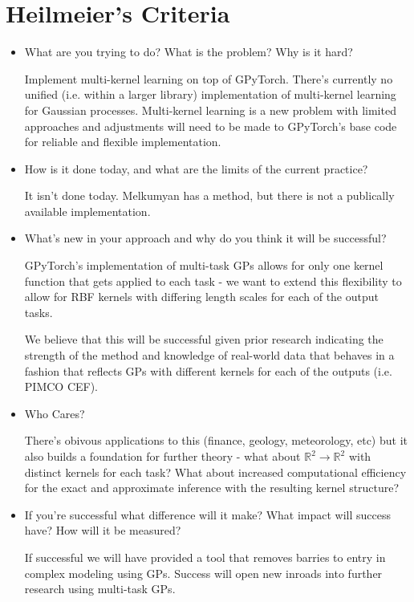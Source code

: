 \documentclass[12pt]{article}
\begin{document}
\section*{Heilmeier's Criteria}
    \begin{itemize}
        \item What are you trying to do? What is the problem? Why is it hard?

        Implement multi-kernel learning on top of GPyTorch. There's currently no unified (i.e. within a larger library) implementation of multi-kernel learning for Gaussian processes. Multi-kernel learning is a new problem with limited approaches and adjustments will need to be made to GPyTorch's base code for reliable and flexible implementation.

        \item How is it done today, and what are the limits of the current practice?

        It isn't done today. Melkumyan has a method, but there is not a publically available implementation.

        \item What's new in your approach and why do you think it will be successful?

        GPyTorch's implementation of multi-task GPs allows for only one kernel function that gets applied to each task - we want to extend this flexibility to allow for RBF kernels with differing length scales for each of the output tasks.

        We believe that this will be successful given prior research indicating the strength of the method and knowledge of real-world data that behaves in a fashion that reflects GPs with different kernels for each of the outputs (i.e. PIMCO CEF).

        \item Who Cares?

        There's obivous applications to this (finance, geology, meteorology, etc) but it also builds a foundation for further theory - what about $\mathbb{R}^2 \rightarrow \mathbb{R}^2$ with distinct kernels for each task? What about increased computational efficiency for the exact and approximate inference with the resulting kernel structure?

        \item If you're successful what difference will it make? What impact will success have? How will it be measured?

        If successful we will have provided a tool that removes barries to entry in complex modeling using GPs. Success will open new inroads into further research using multi-task GPs.


\end{itemize}
\end{document}
